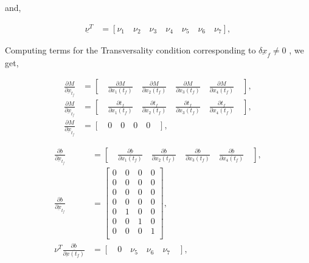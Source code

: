 \documentclass[11pt,usenames]{article}
\begin{document}
	and,
	
	\begin{align}
	\underbar{\nu^{T}} &= \left[ \nu_{1} \quad \nu_{2} \quad \nu_{3} \quad \nu_{4} \quad \nu_{5} \quad \nu_{6} \quad \nu_{7} \right] , \nonumber
	\end{align}
	
	
	\newpage
	
	
	Computing terms for the Transversality condition corresponding to $\delta \underbar{x}_{f} \neq 0$ , we get,
	
	\begin{align}
	\frac{\partial M}{\partial{ \underbar{x}_{t_{f}}}} &= \left[ \quad \frac{\partial M}{\partial{x_{1}(t_{f})}}  \quad \frac{\partial M}{\partial{x_{2}(t_{f})}} \quad \frac{\partial M}{\partial{x_{3}(t_{f})}} \quad \frac{\partial M}{\partial{x_{4}(t_{f})}} \quad \right], \nonumber \\
	\frac{\partial M}{\partial{ \underbar{x}_{t_{f}}}} &= \left[ \quad \frac{\partial t_{f}}{\partial{x_{1}(t_{f})}}  \quad \frac{\partial t_{f}}{\partial{x_{2}(t_{f})}} \quad \frac{\partial t_{f}}{\partial{x_{3}(t_{f})}} \quad \frac{\partial t_{f}}{\partial{x_{4}(t_{f})}} \quad \right], \nonumber \\
	\frac{\partial M}{\partial{ \underbar{x}_{t_{f}}}} &= \left[ \quad 0 \quad 0  \quad 0  \quad 0 \quad  \right],
	\end{align}
	
	\begin{align}
	\frac{\partial{\underbar b}}{\partial{ \underbar{x}_{t_{f}}}} &= \left[ \quad \frac{\partial{\underbar b}}{\partial{x_{1}(t_{f})}} \quad \frac{\partial{\underbar b}}{\partial{x_{2}(t_{f})}} \quad \frac{\partial{\underbar b}}{\partial{x_{3}(t_{f})}} \quad \frac{\partial{\underbar b}}{\partial{x_{4}(t_{f})}}  \quad \right], \nonumber \\
	\frac{\partial{\underbar b}}{\partial{ \underbar{x}_{t_{f}}}} &=
	\begin{bmatrix}
	0 \quad 0 \quad 0 \quad 0 \\ 0 \quad 0 \quad 0 \quad 0  \\ 0 \quad 0 \quad 0 \quad 0  \\ 0 \quad 0 \quad 0 \quad 0  \\ 0 \quad 1 \quad 0 \quad 0  \\ 0 \quad 0 \quad 1 \quad 0  \\ 0 \quad 0 \quad 0 \quad 1  \\
	\end{bmatrix} , \\
	\nu^{T} \frac{\partial \underbar b}{\partial{\underbar{x}(t_{f})} } &= \left[ \quad 0 \quad \nu_{5} \quad \nu_{6} \quad \nu_{7} \quad \right],
	\end{align}
	
\end{document}
